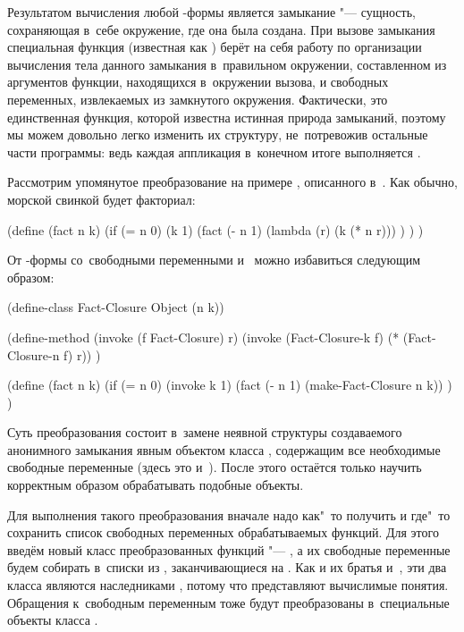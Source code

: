 Результатом вычисления любой -формы является замыкание "--- сущность,
сохраняющая в~себе окружение, где она была создана. При вызове замыкания
специальная функция (известная как ) берёт на себя работу по
организации вычисления тела данного замыкания в~правильном окружении,
составленном из аргументов функции, находящихся в~окружении вызова, и свободных
переменных, извлекаемых из замкнутого окружения. Фактически, это единственная
функция, которой известна истинная природа замыканий, поэтому мы можем довольно
легко изменить их структуру, не~потревожив остальные части программы: ведь
каждая аппликация в~конечном итоге выполняется .

Рассмотрим упомянутое преобразование на примере , описанного
в~\cite{que94}. Как обычно, морской свинкой будет факториал:

\begin{code:lisp}
(define (fact n k)
  (if (= n 0) (k 1)
      (fact (- n 1) (lambda (r) (k (* n r))) ) ) )
\end{code:lisp}

От -формы со~свободными переменными  и~ можно избавиться
следующим образом:

\begin{code:lisp}
(define-class Fact-Closure Object (n k))

(define-method (invoke (f Fact-Closure) r)
  (invoke (Fact-Closure-k f) (* (Fact-Closure-n f) r)) )

(define (fact n k)
  (if (= n 0) (invoke k 1)
      (fact (- n 1) (make-Fact-Closure n k)) ) )
\end{code:lisp}

Суть преобразования состоит в~замене неявной структуры создаваемого анонимного
замыкания явным объектом класса , содержащим все необходимые
свободные переменные (здесь это  и~). После этого остаётся только
научить  корректным образом обрабатывать подобные объекты.

Для выполнения такого преобразования вначале надо как"~то получить и где"~то
сохранить список свободных переменных обрабатываемых функций. Для этого введём
новый класс преобразованных функций "--- , а их свободные
переменные будем собирать в~списки из , заканчивающиеся на
. Как и их братья  и~, эти два класса
являются наследниками , потому что представляют вычислимые понятия.
Обращения к~свободным переменным тоже будут преобразованы в~специальные объекты
класса .

